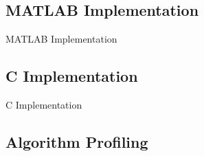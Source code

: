 \subsection{MATLAB Implementation}
\begin{frame}{MATLAB Implementation}
\end{frame}

\subsection{C Implementation}
\begin{frame}{C Implementation}
\end{frame}

\subsection{Algorithm Profiling}
\begin{frame}
\end{frame}

\begin{frame}
\end{frame}

\begin{frame}
\end{frame}

\begin{frame}
\end{frame}

\begin{frame}
\end{frame}

\begin{frame}
\end{frame}

